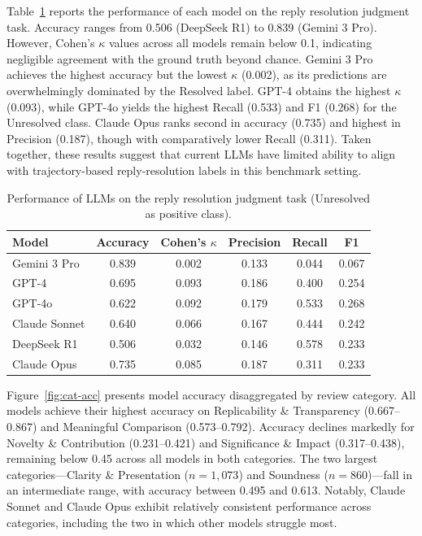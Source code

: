 \documentclass[preprint,10pt,times]{elsarticle}
\begin{document}
Table~\ref{tab:task2} reports the performance of each model on the reply resolution judgment task. Accuracy ranges from 0.506 (DeepSeek R1) to 0.839 (Gemini 3 Pro). However, Cohen's $\kappa$ values across all models remain below 0.1, indicating negligible agreement with the ground truth beyond chance. Gemini 3 Pro achieves the highest accuracy but the lowest $\kappa$ (0.002), as its predictions are overwhelmingly dominated by the Resolved label. GPT-4 obtains the highest $\kappa$ (0.093), while GPT-4o yields the highest Recall (0.533) and F1 (0.268) for the Unresolved class. Claude Opus ranks second in accuracy (0.735) and highest in Precision (0.187), though with comparatively lower Recall (0.311). Taken together, these results suggest that current LLMs have limited ability to align with trajectory-based reply-resolution labels in this benchmark setting.

\begin{table}[htbp]
\centering
\caption{Performance of LLMs on the reply resolution judgment task (Unresolved as positive class).}
\label{tab:task2}
\begin{tabular}{l ccccc}
\toprule
\textbf{Model} & \textbf{Accuracy} & \textbf{Cohen's $\kappa$} & \textbf{Precision} & \textbf{Recall} & \textbf{F1} \\
\midrule
Gemini 3 Pro  & 0.839 & 0.002 & 0.133 & 0.044 & 0.067 \\
GPT-4         & 0.695 & 0.093 & 0.186 & 0.400 & 0.254 \\
GPT-4o        & 0.622 & 0.092 & 0.179 & 0.533 & 0.268 \\
Claude Sonnet & 0.640 & 0.066 & 0.167 & 0.444 & 0.242 \\
DeepSeek R1   & 0.506 & 0.032 & 0.146 & 0.578 & 0.233 \\
Claude Opus   & 0.735 & 0.085 & 0.187 & 0.311 & 0.233 \\
\bottomrule
\end{tabular}
\end{table}

Figure~\ref{fig:cat-acc} presents model accuracy disaggregated by review category. All models achieve their highest accuracy on Replicability \& Transparency (0.667--0.867) and Meaningful Comparison (0.573--0.792). Accuracy declines markedly for Novelty \& Contribution (0.231--0.421) and Significance \& Impact (0.317--0.438), remaining below 0.45 across all models in both categories. The two largest categories---Clarity \& Presentation ($n = 1{,}073$) and Soundness ($n = 860$)---fall in an intermediate range, with accuracy between 0.495 and 0.613. Notably, Claude Sonnet and Claude Opus exhibit relatively consistent performance across categories, including the two in which other models struggle most.
\end{document}
